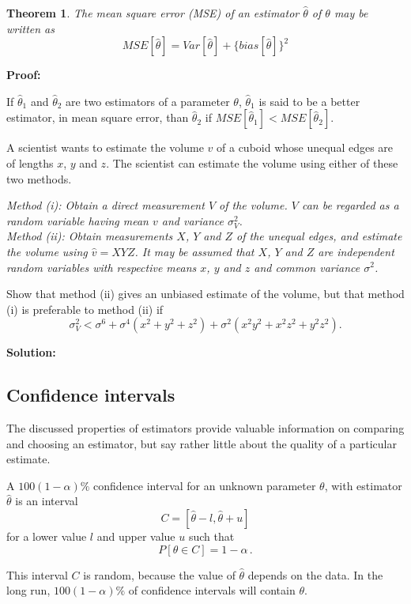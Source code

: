 \documentclass[12pt]{article}
\newtheorem{theorem}{Theorem}[section]
\newenvironment{definition}[1][Definition:]{\begin{trivlist}
\item[\hskip \labelsep {\bfseries #1}]}{\end{trivlist}}
\newenvironment{example}[1][Example:]{\begin{trivlist}
\item[\hskip \labelsep {\bfseries #1}]}{\end{trivlist}}
\begin{document}
\begin{theorem}
The mean square error (MSE) of an estimator $\hat{\theta}$ of $\theta$ may be written as $$MSE[\hat{\theta}]=Var[\hat{\theta}]+\{bias[\hat{\theta}]\}^2$$
\end{theorem}
\begin{mdframed}
{\bf Proof:}
\textcolor[rgb]{1.00,1.00,1.00}{\lipsum[1-3]}
\end{mdframed}

If $\hat{\theta}_{1}$ and $\hat{\theta}_{2}$ are two estimators of a parameter $\theta$, $\hat{\theta}_{1}$ is said to be a better estimator, in mean square error, than $\hat{\theta}_{2}$ if $MSE[\hat{\theta}_{1}]<MSE[\hat{\theta}_{2}]$.


\begin{example}
A scientist wants to estimate the volume $v$ of a cuboid whose unequal edges are of lengths $x$, $y$ and $z$. The scientist can estimate the volume using either of these two methods.

\emph{Method (i): Obtain a direct measurement $V$ of the volume. $V$ can be regarded as a random variable having mean $v$ and variance $\sigma_{V}^{2}$. \\
      Method (ii): Obtain measurements $X$, $Y$ and $Z$ of the unequal edges, and estimate the volume using $\hat{v}=XYZ$. It may be assumed that $X$, $Y$ and $Z$ are independent random variables with respective means $x$, $y$ and $z$ and common variance $\sigma^{2}$.}

Show that method (ii) gives an unbiased estimate of the volume, but that method (i) is preferable to method (ii) if $$\sigma_{V}^{2}<\sigma^{6}+\sigma^{4}(x^{2}+y^{2}+z^{2})+\sigma^{2}(x^{2}y^{2}+x^{2}z^{2}+y^{2}z^{2}).$$
\end{example}

\begin{mdframed}
{\bf Solution:}
\textcolor[rgb]{1.00,1.00,1.00}{\lipsum[1-8]}
\end{mdframed}



\subsection{Confidence intervals}
The discussed properties of estimators provide valuable information on comparing and choosing an estimator, but say rather little about the quality of a particular estimate.
\begin{definition}
 A $100(1-\alpha)\%$ confidence interval for an unknown parameter $\theta$, with estimator $\hat{\theta}$ is an interval
$$C=[\hat{\theta}-l,\hat{\theta}+u]$$
for a lower value $l$ and upper value $u$ such that
$$P[\theta \in C]=1-\alpha\, .$$
\end{definition}
This interval $C$ is random, because the value of $\hat{\theta}$ depends on the data.  In the long run, $100(1 - \alpha)\%$ of confidence intervals will contain $\theta$.
\end{document}
